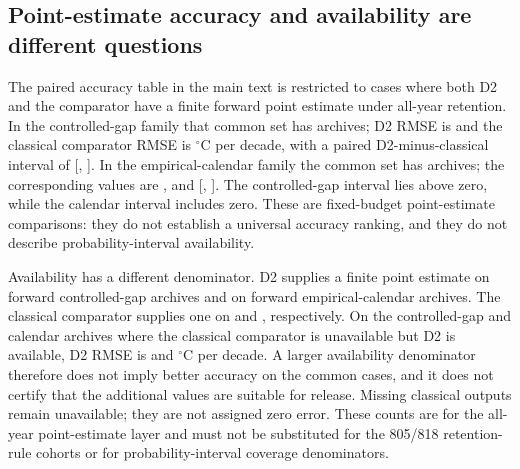 \subsection{Point-estimate accuracy and availability are different questions}

The paired accuracy table in the main text is restricted to cases where both D2 and the comparator have a finite forward point estimate under all-year retention. In the controlled-gap family that common set has \SRCrossedPairN{} archives; D2 RMSE is \SRCrossedDTwoRMSE{} and the classical comparator RMSE is \SRCrossedClassicRMSE{} $^{\circ}$C per decade, with a paired D2-minus-classical interval of [\SRCrossedPairLow, \SRCrossedPairHigh]. In the empirical-calendar family the common set has \SRCalendarPairN{} archives; the corresponding values are \SRCalendarDTwoRMSE{}, \SRCalendarClassicRMSE{} and [\SRCalendarPairLow, \SRCalendarPairHigh]. The controlled-gap interval lies above zero, while the calendar interval includes zero. These are fixed-budget point-estimate comparisons: they do not establish a universal accuracy ranking, and they do not describe probability-interval availability.

Availability has a different denominator. D2 supplies a finite point estimate on \SRAvailDTwoCrossed{} forward controlled-gap archives and on \SRAvailDTwoCalendar{} forward empirical-calendar archives. The classical comparator supplies one on \SRAvailClassicCrossed{} and \SRAvailClassicCalendar{}, respectively. On the \SRAvailCrossedMissingN{} controlled-gap and \SRAvailCalendarMissingN{} calendar archives where the classical comparator is unavailable but D2 is available, D2 RMSE is \SRAvailCrossedMissingRMSE{} and \SRAvailCalendarMissingRMSE{} $^{\circ}$C per decade. A larger availability denominator therefore does not imply better accuracy on the common cases, and it does not certify that the additional values are suitable for release. Missing classical outputs remain unavailable; they are not assigned zero error. These counts are for the all-year point-estimate layer and must not be substituted for the 805/818 retention-rule cohorts or for probability-interval coverage denominators.

